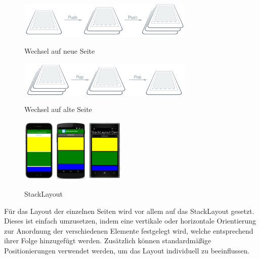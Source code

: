 \begin{figure}[h]
	\begin{center}
		\includegraphics[width=0.75\textwidth]{images/implementation/push.png}
	\end{center}	
	\caption{Wechsel auf neue Seite}
	\cite{Xamarin.HierarchicalNavigation}
	\label{fig:push}
	\begin{center}
		\includegraphics[width=0.75\textwidth]{images/implementation/pop.png}
	\end{center}	
	\caption{Wechsel auf alte Seite}
	\cite{Xamarin.HierarchicalNavigation}
	\label{fig:pop}
\end{figure}

\bigskip

\begin{figure}
	\begin{center}
		\vspace{-1cm}
		\includegraphics[width=0.45\textwidth]{images/implementation/stacklayout.png}
	\end{center}
	\caption{StackLayout}
	\cite{Xamarin.StackLayoutXamarin}
	\label{fig:stacklayout}
\end{figure}

\noindent
Für das Layout der einzelnen Seiten wird vor allem auf das StackLayout gesetzt. Dieses ist einfach umzusetzen, indem eine vertikale oder horizontale Orientierung zur Anordnung der verschiedenen Elemente festgelegt wird, welche entsprechend ihrer Folge hinzugefügt werden. Zusätzlich können standardmäßige Positionierungen verwendet werden, um das Layout individuell zu beeinflussen.

\begin{verbatim}
\end{verbatim}
\newpage

